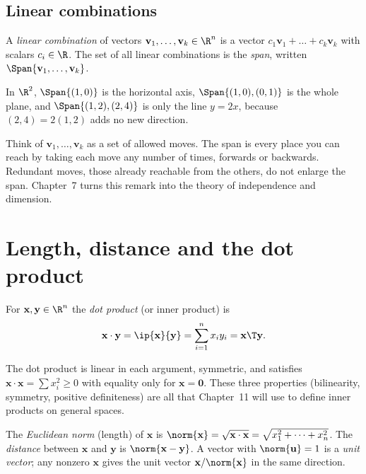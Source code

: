 \subsection*{Linear combinations}

\begin{definition}
A \emph{linear combination} of vectors $\mathbf{v}_1,\dots,\mathbf{v}_k\in\R^n$ is a vector $c_1\mathbf{v}_1+\dots+c_k\mathbf{v}_k$ with scalars $c_i\in\R$. The set of all linear combinations is the \emph{span}, written $\Span\{\mathbf{v}_1,\dots,\mathbf{v}_k\}$.
\end{definition}

\begin{example}
In $\R^2$, $\Span\{(1,0)\}$ is the horizontal axis, $\Span\{(1,0),(0,1)\}$ is the whole plane, and $\Span\{(1,2),(2,4)\}$ is only the line $y=2x$, because $(2,4)=2(1,2)$ adds no new direction.
\end{example}

\begin{intuition}
Think of $\mathbf{v}_1,\dots,\mathbf{v}_k$ as a set of allowed moves. The span is every place you can reach by taking each move any number of times, forwards or backwards. Redundant moves, those already reachable from the others, do not enlarge the span. Chapter~7 turns this remark into the theory of independence and dimension.
\end{intuition}

\section{Length, distance and the dot product}

\begin{definition}
For $\mathbf{x},\mathbf{y}\in\R^n$ the \emph{dot product} (or inner product) is
\[ \mathbf{x}\cdot\mathbf{y}=\ip{\mathbf{x}}{\mathbf{y}}=\sum_{i=1}^n x_iy_i=\mathbf{x}\T\mathbf{y}. \]
\end{definition}

The dot product is linear in each argument, symmetric, and satisfies $\mathbf{x}\cdot\mathbf{x}=\sum x_i^2\ge 0$ with equality only for $\mathbf{x}=\mathbf{0}$. These three properties (bilinearity, symmetry, positive definiteness) are all that Chapter~11 will use to define inner products on general spaces.

\begin{definition}
The \emph{Euclidean norm} (length) of $\mathbf{x}$ is $\norm{\mathbf{x}}=\sqrt{\mathbf{x}\cdot\mathbf{x}}=\sqrt{x_1^2+\dots+x_n^2}$. The \emph{distance} between $\mathbf{x}$ and $\mathbf{y}$ is $\norm{\mathbf{x}-\mathbf{y}}$. A vector with $\norm{\mathbf{u}}=1$ is a \emph{unit vector}; any nonzero $\mathbf{x}$ gives the unit vector $\mathbf{x}/\norm{\mathbf{x}}$ in the same direction.
\end{definition}


